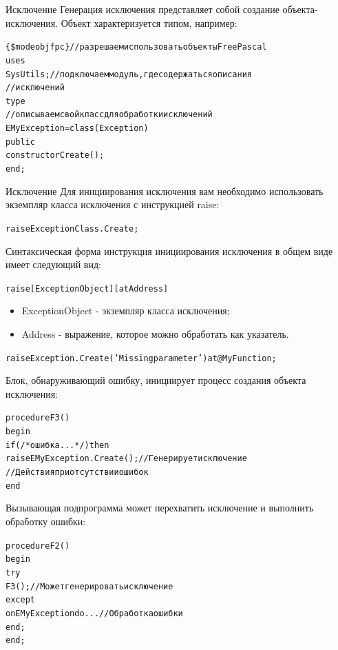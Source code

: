 \documentclass{beamer}
\begin{document}
\begin{frame}[fragile]{Исключение}
Генерация исключения представляет собой создание объекта-исключения. Объект характеризуется типом, например:
\begin{alltt}
\{\$mode objfpc\} //разрешаем использовать объекты Free Pascal
uses
  SysUtils;		  //подключаем модуль, где содержаться описания
  				  //исключений
type
  //описываем свой класс для обработки исключений
  EMyException = class(Exception)
    public
      constructor Create();
  end;
\end{alltt}
\end{frame}

\begin{frame}[fragile]{Исключение}
Для инициирования исключения вам необходимо использовать экземпляр класса исключения с инструкцией raise:
\begin{alltt}
raise ExceptionClass.Create;
\end{alltt}
Синтаксическая форма инструкция инициирования исключения в общем виде имеет следующий вид:
\begin{alltt}
raise [ExceptionObject] [at Address]
\end{alltt}
\begin{itemize}
\item ExceptionObject - экземпляр класса исключения;
\item Address - выражение, которое можно обработать как указатель.
\end{itemize}
\begin{alltt}
raise Exception.Create('Missing parameter') at @MyFunction;
\end{alltt}
\end{frame}

\begin{frame}[fragile]
Блок, обнаруживающий ошибку, инициирует процесс создания объекта исключения:
\begin{alltt}
procedure F3()
begin
  if( /* ошибка... */ ) then
    raise EMyException.Create(); // Генерирует исключение
  // Действия при отсутствии ошибок
end
\end{alltt}
Вызывающая подпрограмма может перехватить исключение и выполнить обработку ошибки:
\begin{alltt}
procedure F2()
begin
  try 
    F3(); // Может генерировать исключение
  except
    on EMyException do ...    // Обработка ошибки
  end;
end;
\end{alltt}
\end{frame}
\end{document}
